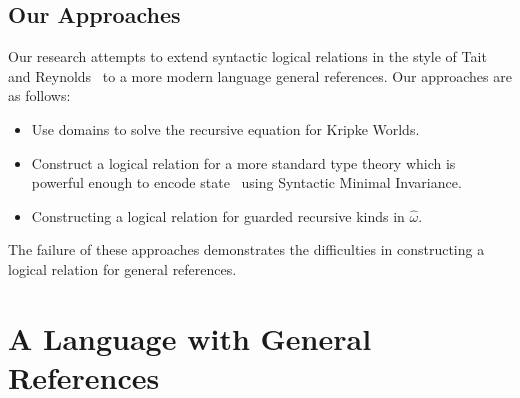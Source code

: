 \documentclass[a0,landscape]{a0poster}
\newcommand{\presheaves}[1]{\ensuremath{\widehat{#1}}}
\begin{document}
\begin{multicols}{4}
  \subsection*{Our Approaches}
  Our research attempts to extend syntactic logical relations in the
  style of Tait and Reynolds~\citep{Tait:67, Reynolds:83} to a more
  modern language general references. Our approaches are as follows:
  \begin{itemize}
  \item Use domains to solve the recursive equation for Kripke Worlds.
  \item Construct a logical relation for a more standard type theory
    which is powerful enough to encode state~\citep{Pottier:11} using
    Syntactic Minimal Invariance.
  \item Constructing a logical relation for guarded recursive kinds
    in $\presheaves{\omega}$.
  \end{itemize}
  The failure of these approaches demonstrates the difficulties in
  constructing a logical relation for general references.

  \color{DarkSlateGray}
  \section*{A Language with General References}


\end{multicols}
\end{document}
